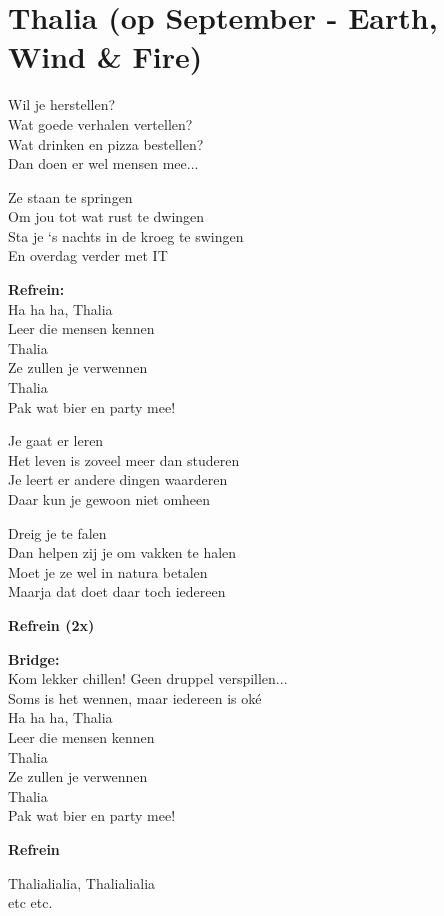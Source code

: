\section{Thalia (op September - Earth, Wind \& Fire)}
Wil je herstellen?\\
Wat goede verhalen vertellen?\\
Wat drinken en pizza bestellen?\\
Dan doen er wel mensen mee...

Ze staan te springen\\
Om jou tot wat rust te dwingen\\
Sta je ‘s nachts in de kroeg te swingen\\
En overdag verder met IT

\textbf{Refrein:}\\
Ha ha ha, Thalia\\
Leer die mensen kennen\\
Thalia\\
Ze zullen je verwennen\\
Thalia\\
Pak wat bier en party mee!

Je gaat er leren\\
Het leven is zoveel meer dan studeren\\
Je leert er andere dingen waarderen\\
Daar kun je gewoon niet omheen

Dreig je te falen\\
Dan helpen zij je om vakken te halen\\
Moet je ze wel in natura betalen\\
Maarja dat doet daar toch iedereen

\textbf{Refrein (2x)}

\textbf{Bridge:}\\
Kom lekker chillen! Geen druppel verspillen...\\
Soms is het wennen, maar iedereen is oké\\
Ha ha ha, Thalia\\
Leer die mensen kennen\\
Thalia\\
Ze zullen je verwennen\\
Thalia\\
Pak wat bier en party mee!

\textbf{Refrein}

Thalialialia, Thalialialia\\
etc etc.